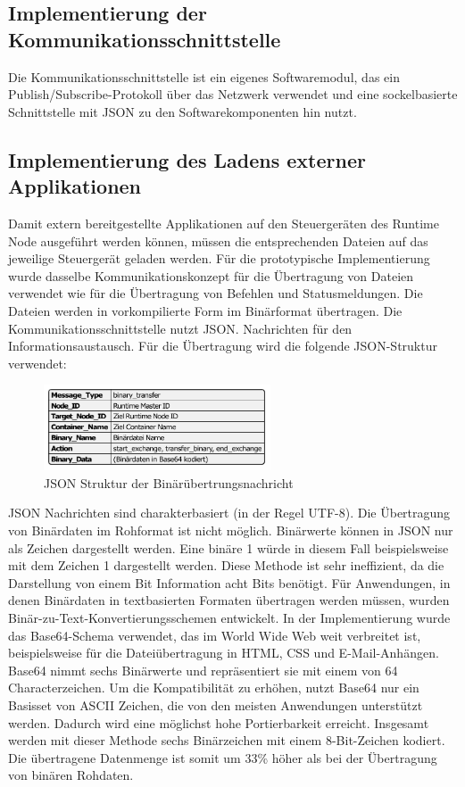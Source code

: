\subsection{Implementierung der Kommunikationsschnittstelle}

Die Kommunikationsschnittstelle ist ein eigenes Softwaremodul, das ein Publish/Subscribe-Protokoll über das Netzwerk verwendet und eine sockelbasierte Schnittstelle mit JSON zu den Softwarekomponenten hin nutzt. 

\subsection{Implementierung des Ladens externer Applikationen}

Damit extern bereitgestellte Applikationen auf den Steuergeräten des Runtime Node ausgeführt werden können, müssen die entsprechenden Dateien auf das jeweilige Steuergerät geladen werden. Für die prototypische Implementierung wurde dasselbe Kommunikationskonzept für die Übertragung von Dateien verwendet wie für die Übertragung von Befehlen und Statusmeldungen. Die Dateien werden in vorkompilierte Form im Binärformat übertragen. Die Kommunikationsschnittstelle nutzt \gls{JSON}. Nachrichten für den Informationsaustausch. Für die Übertragung wird die folgende JSON-Struktur verwendet:

\begin{figure}[htbp]
	\centering
	\includegraphics[width=0.6\textwidth]{./content/graphics/binaryJSON.pdf}
	\caption{JSON Struktur der Binärübertrungsnachricht}
	\label{JSON binary}
\end{figure}

\gls{JSON} Nachrichten sind charakterbasiert (in der Regel UTF-8). Die Übertragung von Binärdaten im Rohformat ist nicht möglich. Binärwerte können in \gls{JSON} nur als Zeichen dargestellt werden. Eine binäre 1 würde in diesem Fall beispielsweise mit dem Zeichen 1 dargestellt werden. Diese Methode ist sehr ineffizient, da die Darstellung von einem Bit Information acht Bits benötigt. Für Anwendungen, in denen Binärdaten in textbasierten Formaten übertragen werden müssen, wurden Binär-zu-Text-Konvertierungsschemen entwickelt. In der Implementierung wurde das Base64-Schema verwendet, das im World Wide Web weit verbreitet ist, beispielsweise für die Dateiübertragung in HTML, CSS und E-Mail-Anhängen. Base64 nimmt sechs Binärwerte und repräsentiert sie mit einem von 64 Characterzeichen. Um die Kompatibilität zu erhöhen, nutzt Base64 nur ein Basisset von \gls{ASCII} Zeichen, die von den meisten Anwendungen unterstützt werden. Dadurch wird eine möglichst hohe Portierbarkeit erreicht. Insgesamt werden mit dieser Methode sechs Binärzeichen mit einem 8-Bit-Zeichen kodiert. Die übertragene Datenmenge ist somit um 33\% höher als bei der Übertragung von binären Rohdaten. 

